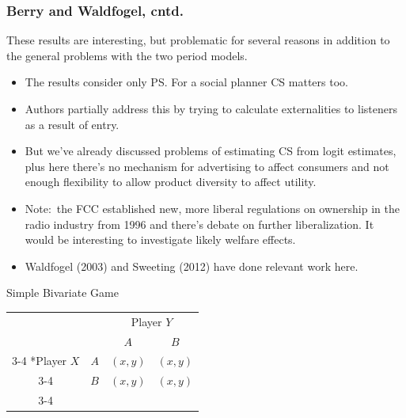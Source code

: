 \documentclass[aspectratio=169,11pt]{beamer}
\begin{document}
\begin{frame}
\frametitle{Berry and Waldfogel, cntd.}
These results are interesting, but problematic for several reasons in
addition to the general problems with the two period models.
\begin{itemize}
\item The results consider only PS. For a social planner CS matters too.
\item Authors partially address this by trying to calculate externalities to
listeners as a result of entry.
\item But we've already discussed problems of estimating CS from logit
estimates, plus here there's no mechanism for advertising to affect
consumers and not enough flexibility to allow product diversity to affect
utility.
\item Note:\ the FCC established new, more liberal regulations on ownership
in the radio industry from 1996 and there's debate on further
liberalization. It would be interesting to investigate likely welfare
effects.
\item Waldfogel (2003) and Sweeting (2012) have done relevant work here.
\end{itemize}
\end{frame}

\begin{frame}{Simple Bivariate Game}
  \begin{table}
    \setlength{\extrarowheight}{2pt}
    \begin{tabular}{cc|c|c|}
      & \multicolumn{1}{c}{} & \multicolumn{2}{c}{Player $Y$}\\
      & \multicolumn{1}{c}{} & \multicolumn{1}{c}{$A$}  & \multicolumn{1}{c}{$B$} \\\cline{3-4}
      \multirow{2}*{Player $X$}  & $A$ & $(x,y)$ & $(x,y)$ \\\cline{3-4}
      & $B$ & $(x,y)$ & $(x,y)$ \\\cline{3-4}
    \end{tabular}
  \end{table}

\end{frame}
\end{document}
